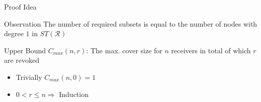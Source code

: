 \documentclass[10pt]{beamer}
\begin{document}
\begin{frame}{Proof Idea}
\begin{block}{Observation}
\alert{The number of required subsets is equal to the number of nodes with degree $1$ in $ST(\mathcal{R})$}
\end{block}
\vskip 1cm

\begin{block}{Upper Bound $C_{max}(n,r)$:}
The max. cover size for $n$ receivers in total of which $r$ are revoked
\begin{itemize}
  \item Trivially $C_{max}(n,0) = 1$
  \item $0 < r \leq n \Longrightarrow$ Induction
\end{itemize}
\end{block}

\end{frame}
\end{document}

